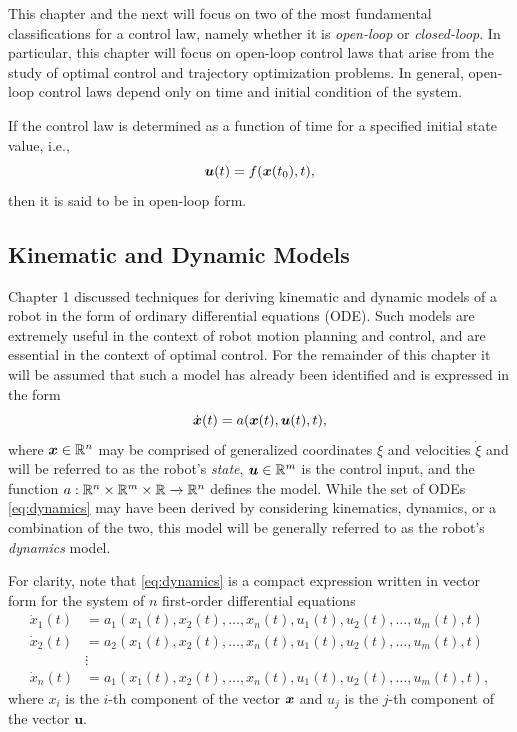 This chapter and the next will focus on two of the most fundamental classifications for a control law, namely whether it is \textit{open-loop} or \textit{closed-loop}. In particular, this chapter will focus on open-loop control laws that arise from the study of optimal control and trajectory optimization problems\cite{Kirk2004}\cite[\baselineskip]{Murray2009}. In general, open-loop control laws depend only on time and initial condition of the system.

\begin{definition}  \label{def:openloop}
If the control law is determined as a function of time for a specified initial state value, i.e., 
\begin{equation}
    \bm{u}(t) = f ( \bm{x} ( t_0 ) , t ),
\end{equation}
then it is said to be in open-loop form.
\end{definition}


\subsection{Kinematic and Dynamic Models}
Chapter 1 discussed techniques for deriving kinematic and dynamic models of a robot in the form of ordinary differential equations (ODE). Such models are extremely useful in the context of robot motion planning and control, and are essential in the context of optimal control.
For the remainder of this chapter it will be assumed that such a model has already been identified and is expressed in the form
\begin{equation} \label{eq:dynamics}
    \dot{\bm{x}}(t) = a(\bm{x}(t),\bm{u}(t),t),
\end{equation}
where $\bm{x} \in \mathbb{R}^n$ may be comprised of generalized coordinates $\xi$ and velocities $\dot{\xi}$ and will be referred to as the robot's \textit{state}, $\bm{u} \in \mathbb{R}^m$ is the control input, and the function $a : \mathbb{R}^n \times \mathbb{R}^m \times \mathbb{R} \xrightarrow{} \mathbb{R}^n$ defines the model. While the set of ODEs \eqref{eq:dynamics} may have been derived by considering kinematics, dynamics, or a combination of the two, this model will be generally referred to as the robot's \textit{dynamics} model.

For clarity, note that \eqref{eq:dynamics} is a compact expression written in vector form for the system of $n$ first-order differential equations 
\begin{align*}
    \dot{x}_1(t)&=a_1(x_1(t), x_2(t), \dots, x_n(t), u_1(t), u_2(t), \dots, u_m(t), t)\\
    \dot{x}_2(t)&=a_2(x_1(t), x_2(t), \dots, x_n(t), u_1(t), u_2(t), \dots, u_m(t), t)\\
&\vdots \\
    \dot{x}_n(t)&=a_1(x_1(t), x_2(t), \dots, x_n(t), u_1(t), u_2(t), \dots, u_m(t), t),
\end{align*}
where $x_i$ is the $i$-th component of the vector $\bm{x}$ and $u_j$ is the $j$-th component of the vector $\bm{u}$.

